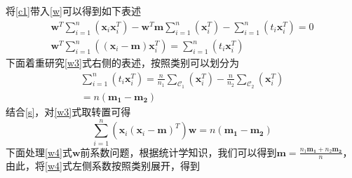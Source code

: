 \documentclass[UTF8,a4paper]{ctexart}
\begin{document}
\subsection{}
将\ref{c1}带入\ref{w}可以得到如下表述
\begin{equation}\begin{aligned}
\displaystyle{
\mathbf{w}^T\sum_{i=1}^n(\mathbf{x}_i\mathbf{x}_i^T)-\mathbf{w}^T\mathbf{m}\sum_{i=1}^n(\mathbf{x}_i^T)-\sum_{i=1}^n(t_i\mathbf{x}_i^T)=0}\\
\displaystyle{
\mathbf{w}^T\sum_{i=1}^n((\mathbf{x}_i-\mathbf{m})\mathbf{x}_i^T)=\sum_{i=1}^n(t_i\mathbf{x}_i^T)}
\label{w3}
\end{aligned}\end{equation}
下面着重研究\ref{w3}式右侧的表述，按照类别可以划分为
\begin{equation}\begin{aligned}
\displaystyle{
\sum_{i=1}^n(t_i\mathbf{x}_i^T)=\frac{n}{n_1}\sum_{\mathcal{C}_1}(\mathbf{x}_i^T)-\frac{n}{n_2}\sum_{\mathcal{C}_2}(\mathbf{x}_i^T)}\\
=n(\mathbf{m_1-m_2})
\label{s}
\end{aligned}\end{equation}
结合\ref{s}，对\ref{w3}式取转置可得
\begin{equation}
\displaystyle{
\sum_{i=1}^n(\mathbf{x}_i(\mathbf{x}_i-\mathbf{m})^T)\mathbf{w}=n(\mathbf{m_1-m_2})}
\label{w4}
\end{equation}
下面处理\ref{w4}式$\mathbf{w}$前系数问题，根据统计学知识，我们可以得到$\mathbf{m}=\frac{n_1\mathbf{m_1}+n_2\mathbf{m_2}}{n}$，由此，将\ref{w4}式左侧系数按照类别展开，得到
\end{document}
